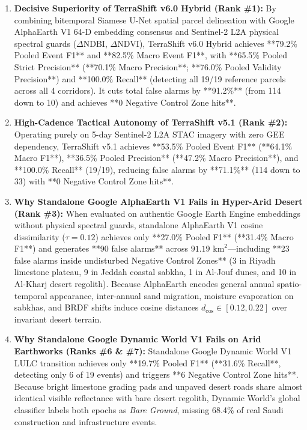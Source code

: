 \begin{enumerate}
    \item \textbf{Decisive Superiority of TerraShift v6.0 Hybrid (Rank \#1):} By combining bitemporal Siamese U-Net spatial parcel delineation with Google AlphaEarth V1 64-D embedding consensus and Sentinel-2 L2A physical spectral guards ($\Delta\text{NDBI}$, $\Delta\text{NDVI}$), TerraShift v6.0 Hybrid achieves **79.2\% Pooled Event F1** and **82.5\% Macro Event F1**, with **65.5\% Pooled Strict Precision** (**70.1\% Macro Precision**; **76.0\% Pooled Validity Precision**) and **100.0\% Recall** (detecting all 19/19 reference parcels across all 4 corridors). It cuts total false alarms by **91.2\%** (from 114 down to 10) and achieves **0 Negative Control Zone hits**.
    \item \textbf{High-Cadence Tactical Autonomy of TerraShift v5.1 (Rank \#2):} Operating purely on 5-day Sentinel-2 L2A STAC imagery with zero GEE dependency, TerraShift v5.1 achieves **53.5\% Pooled Event F1** (**64.1\% Macro F1**), **36.5\% Pooled Precision** (**47.2\% Macro Precision**), and **100.0\% Recall** (19/19), reducing false alarms by **71.1\%** (114 down to 33) with **0 Negative Control Zone hits**.
    \item \textbf{Why Standalone Google AlphaEarth V1 Fails in Hyper-Arid Desert (Rank \#3):} When evaluated on authentic Google Earth Engine embeddings without physical spectral guards, standalone AlphaEarth V1 cosine dissimilarity ($\tau=0.12$) achieves only **27.0\% Pooled F1** (**31.4\% Macro F1**) and generates **90 false alarms** across $91.19\text{ km}^2$—including **23 false alarms inside undisturbed Negative Control Zones** (3 in Riyadh limestone plateau, 9 in Jeddah coastal sabkha, 1 in Al-Jouf dunes, and 10 in Al-Kharj desert regolith). Because AlphaEarth encodes general annual spatio-temporal appearance, inter-annual sand migration, moisture evaporation on sabkhas, and BRDF shifts induce cosine distances $d_{\cos} \in [0.12, 0.22]$ over invariant desert terrain.
    \item \textbf{Why Standalone Google Dynamic World V1 Fails on Arid Earthworks (Ranks \#6 \& \#7):} Standalone Google Dynamic World V1 LULC transition achieves only **19.7\% Pooled F1** (**31.6\% Recall**, detecting only 6 of 19 events) and triggers **6 Negative Control Zone hits**. Because bright limestone grading pads and unpaved desert roads share almost identical visible reflectance with bare desert regolith, Dynamic World's global classifier labels both epochs as \textit{Bare Ground}, missing 68.4\% of real Saudi construction and infrastructure events.
\end{enumerate}

